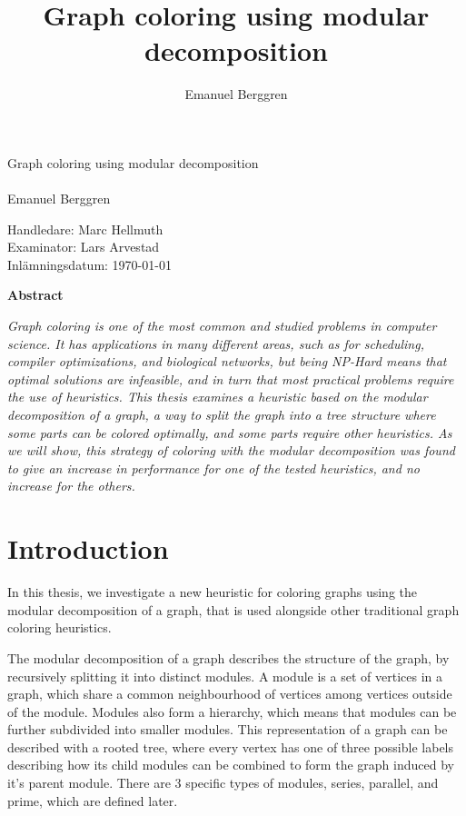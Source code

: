 \documentclass[a4paper]{article}
\author{Emanuel Berggren}
\title{Graph coloring using modular decomposition}
\newcommand{\Framsida}{\AddToShipoutPicture*{\put(0,0){\texttt{[image: kandidatfram.pdf]}}}}
\begin{document}
\sloppy
\Framsida 
\vspace*{4cm}
\Huge{Graph coloring using modular decomposition}\\\\ %
\Large{Emanuel Berggren} %

\vspace*{12cm}
\Large{Handledare: Marc Hellmuth} \\ 
\Large{Examinator: Lars Arvestad} \\ 
\Large{Inlämningsdatum: \today}\\

\begin{center}
	\textbf{Abstract}
\end{center}
\textit{
Graph coloring is one of the most common and studied problems in computer
science. It has applications in many different areas, such as for scheduling,
compiler optimizations, and biological networks, but
being NP-Hard means that optimal solutions are infeasible, and in turn that most
practical problems require the use of heuristics. This thesis examines a
heuristic based on the modular decomposition of a graph, a way to split the graph
into a tree structure where some parts can be colored optimally,
and some parts require other heuristics. As we will show, this strategy of coloring with the
modular decomposition was found to give an increase in performance for one
of the tested heuristics, and no increase for the others.
}




\tableofcontents

\section{Introduction}


In this thesis, we investigate a new heuristic for coloring graphs using the
modular decomposition of a graph, that is used alongside other traditional
graph coloring heuristics.

The modular decomposition of a graph describes the structure of the graph, by
recursively splitting it into distinct modules. A module is a set of vertices
in a graph, which share a common neighbourhood of vertices among vertices
outside of the module. Modules also form a hierarchy, which means that modules
can be further subdivided into smaller modules. This representation of a graph
can be described with a rooted tree, where every vertex has one of three
possible labels describing how its child modules can be combined to form the
graph induced by it's parent module. There are 3 specific types of modules,
series, parallel, and prime, which are defined later.
\end{document}
